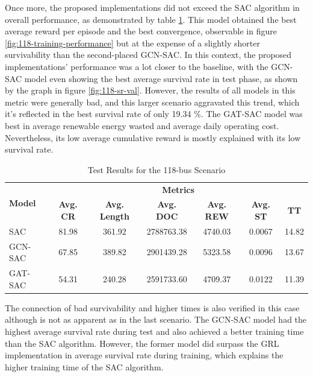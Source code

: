 Once more, the proposed implementations did not exceed the \ac{SAC} algorithm in overall performance, as demonstrated by table \ref{tab:test-118}. This model obtained the best average reward per episode and the best convergence, observable in figure \ref{fig:118-training-performance} but at the expense of a slightly shorter survivability than the second-placed GCN-SAC. In this context, the proposed implementations' performance was a lot closer to the baseline, with the GCN-SAC model even showing the best average survival rate in test phase, as shown by the graph in figure \ref{fig:118-sr-val}. However, the results of all models in this metric were generally bad, and this larger scenario aggravated this trend, which it's reflected in the best survival rate of only 19.34 \%. The GAT-SAC model was best in average renewable energy wasted and average daily operating cost. Nevertheless, its low average cumulative reward is mostly explained with its low survival rate. \par

\begin{table}[h!]
	\centering
	\caption{Test Results for the 118-bus Scenario}
	\begin{tabular}{lcccccc}
		\toprule
		\multirow{2}{*}{\textbf{Model}} & \multicolumn{6}{c}{\textbf{Metrics}} \\ 
		\cmidrule(lr){2-7}
		&  \textbf{Avg. CR} & \textbf{Avg. Length} & \textbf{Avg. DOC} & \textbf{Avg. REW} & \textbf{Avg. ST} & \textbf{TT} \\ 
		\midrule
		SAC & 81.98 & 361.92 & 2788763.38 & 4740.03 & 0.0067 & 14.82 \\
		GCN-SAC & 67.85 & 389.82 & 2901439.28 & 5323.58 & 0.0096 & 13.67 \\
		GAT-SAC & 54.31 & 240.28 & 2591733.60 & 4709.37 & 0.0122 & 11.39 \\
		\bottomrule
	\end{tabular}
	\label{tab:test-118}
\end{table}

The connection of bad survivability and higher times is also verified in this case although is not as apparent as in the last scenario. The GCN-SAC model had the highest average survival rate during test and also achieved a better training time than the \ac{SAC} algorithm. However, the former model did surpass the \ac{GRL} implementation in average survival rate during training, which explains the higher training time of the \ac{SAC} algorithm. \par


